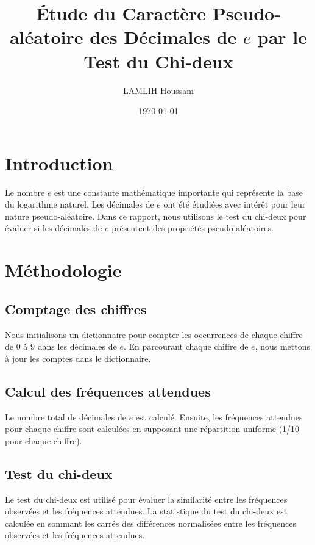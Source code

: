 \documentclass{article}
\begin{document}
\title{Étude du Caractère Pseudo-aléatoire des Décimales de \(e\) par le Test du Chi-deux}
\author{LAMLIH Houssam}
\date{\today}
\maketitle

\section{Introduction}

Le nombre \(e\) est une constante mathématique importante qui représente la base du logarithme naturel. Les décimales de \(e\) ont été étudiées avec intérêt pour leur nature pseudo-aléatoire. Dans ce rapport, nous utilisons le test du chi-deux pour évaluer si les décimales de \(e\) présentent des propriétés pseudo-aléatoires.

\section{Méthodologie}

\subsection{Comptage des chiffres}

Nous initialisons un dictionnaire pour compter les occurrences de chaque chiffre de 0 à 9 dans les décimales de \(e\). En parcourant chaque chiffre de \(e\), nous mettons à jour les comptes dans le dictionnaire.

\subsection{Calcul des fréquences attendues}

Le nombre total de décimales de \(e\) est calculé. Ensuite, les fréquences attendues pour chaque chiffre sont calculées en supposant une répartition uniforme (1/10 pour chaque chiffre).

\subsection{Test du chi-deux}

Le test du chi-deux est utilisé pour évaluer la similarité entre les fréquences observées et les fréquences attendues. La statistique du test du chi-deux est calculée en sommant les carrés des différences normalisées entre les fréquences observées et les fréquences attendues.
\end{document}
